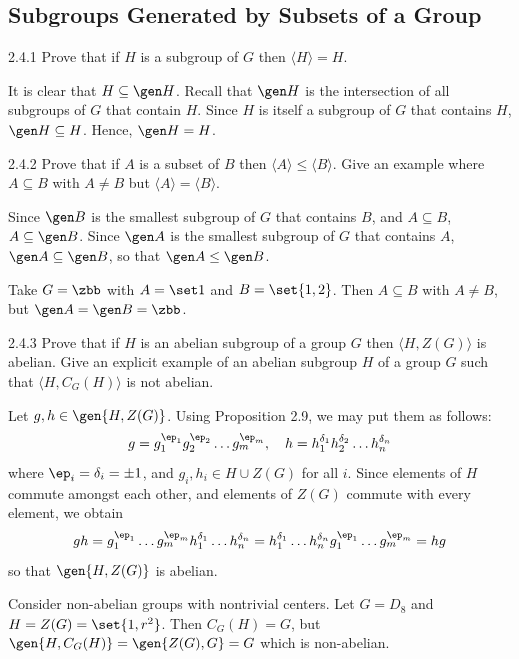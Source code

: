 \subsection{Subgroups Generated by Subsets of a Group}

\begin{exercise}{2.4.1}
    Prove that if $H$ is a subgroup of $G$ then $\langle H\rangle = H$.
\end{exercise}

\begin{sol}
    It is clear that $H \subseteq \gen H$.
	Recall that $\gen H$ is the intersection of all subgroups of $G$ that contain $H$.
	Since $H$ is itself a subgroup of $G$ that contains $H$, $\gen H \subseteq H$.
	Hence, $\gen H = H$.
\end{sol}

\begin{exercise}{2.4.2}
    Prove that if $A$ is a subset of $B$ then $\langle A\rangle \leq \langle B\rangle$.
	Give an example where $A \subseteq B$ with $A \ne B$ but $\langle A\rangle = \langle B\rangle$.
\end{exercise}

\begin{sol}
    Since $\gen B$ is the smallest subgroup of $G$ that contains $B$, and $A \subseteq B$, $A \subseteq \gen B$.
	Since $\gen A$ is the smallest subgroup of $G$ that contains $A$, $\gen A \subseteq \gen B$, so that $\gen A \leq \gen B$.

    Take $G = \zbb$ with $A = \set 1$ and $B = \set{1, 2}$.
	Then $A \subseteq B$ with $A \ne B$, but $\gen A = \gen B = \zbb$.
\end{sol}

\begin{exercise}{2.4.3}
    Prove that if $H$ is an abelian subgroup of a group $G$ then $\langle H, Z(G)\rangle$ is abelian.
	Give an explicit example of an abelian subgroup $H$ of a group $G$ such that $\langle H, C_G(H)\rangle$ is not abelian.
\end{exercise}

\begin{sol}
    Let $g, h \in \gen{H, Z(G)}$.
	Using Proposition 2.9, we may put them as follows:
    \[
    	g = g_1^{\ep_1}g_2^{\ep_2} \ldots g_m^{\ep_m}, \quad h = h_1^{\delta_1}h_2^{\delta_2} \ldots h_n^{\delta_n}
    \]
    where $\ep_i = \delta_i = \pm 1$, and $g_i, h_i \in H \cup Z(G)$ for all $i$.
	Since elements of $H$ commute amongst each other, and elements of $Z(G)$ commute with every element, we obtain
    \[
    	gh = g_1^{\ep_1} \ldots g_m^{\ep_m}h_1^{\delta_1} \ldots h_n^{\delta_n} = h_1^{\delta_1} \ldots h_n^{\delta_n}g_1^{\ep_1} \ldots g_m^{\ep_m} = hg
    \]
    so that $\gen{H, Z(G)}$ is abelian.

    Consider non-abelian groups with nontrivial centers.
	Let $G = D_8$ and $H = Z(G) = \set{1, r^2}$.
	Then $C_G(H) = G$, but $\gen{H, C_G(H)} = \gen{Z(G), G} = G$ which is non-abelian.
\end{sol}

